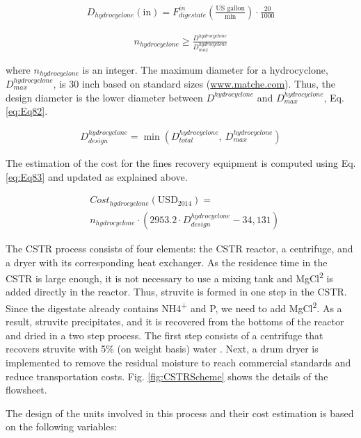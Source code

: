 \begin{refsection}[referencesCh2]
\begin{align}
	{D}_{hydrocyclone}\left( {\text{in}} \right) = F_{digestate}^{in} \left( \frac{\text{US gallon}}{\text{min}} \right) \cdot \frac{20}{1000} \label{eq:Eq80}
\end{align}

\begin{align}
	{n}_{hydrocyclone} \ge \frac{D^{hydrocyclone}}{D_{max}^{hydrocyclone}} \label{eq:Eq81}
\end{align}

where ${n}_{hydrocyclone}$ is an integer. The maximum diameter for a hydrocyclone, $D_{max}^{hydrocyclone}$,  is 30 inch based on standard sizes (\url{www.matche.com}).  Thus, the design diameter is the lower diameter between $D^{hydrocyclone}$ and $D_{max}^{hydrocyclone}$, Eq. \ref{eq:Eq82}.

\begin{align}
	D_{design}^{hydrocyclone} = \min (D_{total}^{hydrocyclone}, \ D_{max}^{hydrocyclone}) \label{eq:Eq82}
\end{align}

The estimation of the cost for the fines recovery equipment is computed using Eq. \ref{eq:Eq83} and updated as explained above.

\begin{align}
	& Cost_{hydrocyclone} \left( \text{USD}_{2014} \right) = \label{eq:Eq83} \\
	& {n}_{hydrocyclone} \cdot \left( {2953.2} \cdot D_{design}^{hydrocyclone} - 34,131 \right) \nonumber
\end{align}

The CSTR process consists of four elements: the CSTR reactor, a centrifuge, and a dryer with its corresponding heat exchanger. As the residence time in the CSTR is large enough, it is not necessary to use a mixing tank and MgCl\textsuperscript{2} is added directly in the reactor. Thus, struvite is formed in one step in the CSTR. Since the digestate already contains NH4\textsuperscript{+} and P, we need to add MgCl\textsuperscript{2}. As a result, struvite precipitates, and it is recovered from the bottoms of the reactor and dried in a two step process. The first step consists of a centrifuge that recovers struvite with 5\% (on weight basis) water \citep{baasal1989preliminary}. Next, a drum dryer is implemented to remove the residual moisture to reach commercial standards and reduce transportation costs. Fig. \ref{fig:CSTRScheme} shows the details of the flowsheet. 

The design of the units involved in this process and their cost estimation is based on the following variables:


\end{refsection}
